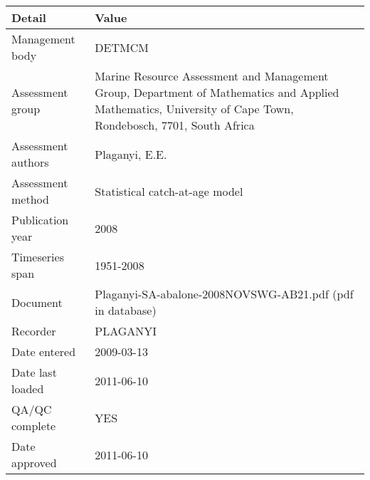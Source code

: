 \begin{table}[htb]
\centering
\begin{tabular}{lp{7cm}}
\toprule
Detail & Value \\
\midrule
Management body    & DETMCM                                                                                                                                                      \\
Assessment group   & Marine Resource Assessment and Management Group, Department of Mathematics and Applied Mathematics, University of Cape Town, Rondebosch, 7701, South Africa \\
Assessment authors & Plaganyi, E.E.                                                                                                                                              \\
Assessment method  & Statistical catch-at-age model                                                                                                                              \\
Publication year   & 2008                                                                                                                                                        \\
Timeseries span    & 1951-2008                                                                                                                                                   \\
Document           & Plaganyi-SA-abalone-2008NOVSWG-AB21.pdf (pdf in database)                                                                                                   \\
Recorder           & PLAGANYI                                                                                                                                                    \\
Date entered       & 2009-03-13                                                                                                                                                  \\
Date last loaded   & 2011-06-10                                                                                                                                                  \\
QA/QC complete     & YES                                                                                                                                                         \\
Date approved      & 2011-06-10                                                                                                                                                  \\
\bottomrule
\end{tabular}
\label{tab:assessdet}
\end{table}
